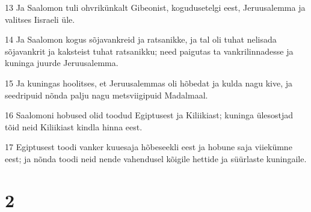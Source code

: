 \par 13 Ja Saalomon tuli ohvrikünkalt Gibeonist, kogudusetelgi eest, Jeruusalemma ja valitses Iisraeli üle.
\par 14 Ja Saalomon kogus sõjavankreid ja ratsanikke, ja tal oli tuhat nelisada sõjavankrit ja kaksteist tuhat ratsanikku; need paigutas ta vankrilinnadesse ja kuninga juurde Jeruusalemma.
\par 15 Ja kuningas hoolitses, et Jeruusalemmas oli hõbedat ja kulda nagu kive, ja seedripuid nõnda palju nagu metsviigipuid Madalmaal.
\par 16 Saalomoni hobused olid toodud Egiptusest ja Kiliikiast; kuninga ülesostjad tõid neid Kiliikiast kindla hinna eest.
\par 17 Egiptusest toodi vanker kuuesaja hõbeseekli eest ja hobune saja viiekümne eest; ja nõnda toodi neid nende vahendusel kõigile hettide ja süürlaste kuningaile.

\chapter{2}

